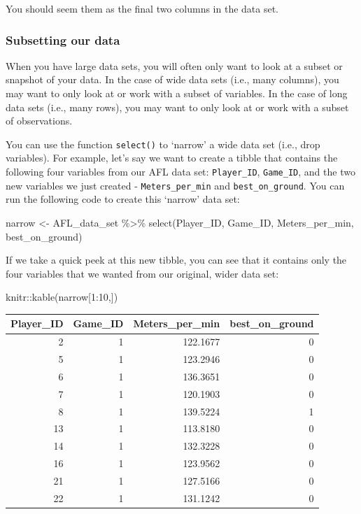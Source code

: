 \documentclass[
]{article}
\newenvironment{Shaded}{\begin{snugshade}}{\end{snugshade}}
\newcommand{\DecValTok}[1]{\textcolor[rgb]{0.00,0.00,0.81}{#1}}
\newcommand{\FunctionTok}[1]{\textcolor[rgb]{0.00,0.00,0.00}{#1}}
\newcommand{\NormalTok}[1]{#1}
\newcommand{\OtherTok}[1]{\textcolor[rgb]{0.56,0.35,0.01}{#1}}
\newcommand{\SpecialCharTok}[1]{\textcolor[rgb]{0.00,0.00,0.00}{#1}}
\begin{document}
You should seem them as the final two columns in the data set.

\hypertarget{subsetting-our-data}{%
\subsubsection{Subsetting our data}\label{subsetting-our-data}}

When you have large data sets, you will often only want to look at a
subset or snapshot of your data. In the case of wide data sets (i.e.,
many columns), you may want to only look at or work with a subset of
variables. In the case of long data sets (i.e., many rows), you may want
to only look at or work with a subset of observations.

You can use the function \texttt{select()} to `narrow' a wide data set
(i.e., drop variables). For example, let's say we want to create a
tibble that contains the following four variables from our AFL data set:
\texttt{Player\_ID}, \texttt{Game\_ID}, and the two new variables we
just created - \texttt{Meters\_per\_min} and \texttt{best\_on\_ground}.
You can run the following code to create this `narrow' data set:

\begin{Shaded}
\begin{Highlighting}[]
\NormalTok{narrow }\OtherTok{\textless{}{-}}\NormalTok{ AFL\_data\_set }\SpecialCharTok{\%\textgreater{}\%}
  \FunctionTok{select}\NormalTok{(Player\_ID, Game\_ID, Meters\_per\_min, best\_on\_ground)}
\end{Highlighting}
\end{Shaded}

If we take a quick peek at this new tibble, you can see that it contains
only the four variables that we wanted from our original, wider data
set:

\begin{Shaded}
\begin{Highlighting}[]
\NormalTok{knitr}\SpecialCharTok{::}\FunctionTok{kable}\NormalTok{(narrow[}\DecValTok{1}\SpecialCharTok{:}\DecValTok{10}\NormalTok{,])}
\end{Highlighting}
\end{Shaded}

\begin{longtable}[]{@{}rrrr@{}}
\toprule()
Player\_ID & Game\_ID & Meters\_per\_min & best\_on\_ground \\
\midrule()
\endhead
2 & 1 & 122.1677 & 0 \\
5 & 1 & 123.2946 & 0 \\
6 & 1 & 136.3651 & 0 \\
7 & 1 & 120.1903 & 0 \\
8 & 1 & 139.5224 & 1 \\
13 & 1 & 113.8180 & 0 \\
14 & 1 & 132.3228 & 0 \\
16 & 1 & 123.9562 & 0 \\
21 & 1 & 127.5166 & 0 \\
22 & 1 & 131.1242 & 0 \\
\bottomrule()
\end{longtable}
\end{document}
